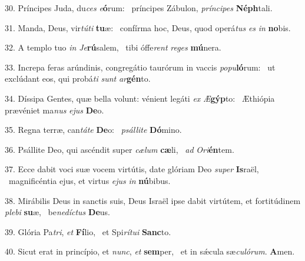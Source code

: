 30. Príncipes Juda, du\textit{ces} \textit{e}\textbf{ó}rum: \ast\  príncipes Zábulon, \textit{prín}\textit{ci}\textit{pes} \textbf{Néph}tali.\

31. Manda, Deus, vir\textit{tú}\textit{ti} \textbf{tu}æ: \ast\  confírma hoc, Deus, quod operá\textit{tus} \textit{es} \textit{in} \textbf{no}bis.\

32. A templo tuo \textit{in} \textit{Je}\textbf{rú}salem, \ast\  tibi óffe\textit{rent} \textit{re}\textit{ges} \textbf{mú}nera.\

33. Increpa feras arúndinis, congregátio taurórum in vaccis \textit{po}\textit{pu}\textbf{ló}rum: \ast\  ut exclúdant eos, qui probá\textit{ti} \textit{sunt} \textit{ar}\textbf{gén}to.\

34. Díssipa Gentes, quæ bella volunt: vénient legáti \textit{ex} \textit{Æ}\textbf{gýp}to: \ast\  Æthiópia prævéniet ma\textit{nus} \textit{e}\textit{jus} \textbf{De}o.\

35. Regna terræ, can\textit{tá}\textit{te} \textbf{De}o: \ast\  \textit{psál}\textit{li}\textit{te} \textbf{Dó}mino.\

36. Psállite Deo, qui ascéndit super \textit{cæ}\textit{lum} \textbf{cæ}li, \ast\  \textit{ad} \textit{O}\textit{ri}\textbf{én}tem.\

37. Ecce dabit voci suæ vocem virtútis, date glóriam Deo \textit{su}\textit{per} \textbf{Is}raël, \ast\  magnificéntia ejus, et virtus \textit{e}\textit{jus} \textit{in} \textbf{nú}bibus.\

38. Mirábilis Deus in sanctis suis, Deus Israël ipse dabit virtútem, et fortitúdinem \textit{ple}\textit{bi} \textbf{su}æ, \ast\  be\textit{ne}\textit{díc}\textit{tus} \textbf{De}us.\

39. Glória Pa\textit{tri}, \textit{et} \textbf{Fí}lio, \ast\  et Spi\textit{rí}\textit{tu}\textit{i} \textbf{Sanc}to.\

40. Sicut erat in princípio, et \textit{nunc}, \textit{et} \textbf{sem}per, \ast\  et in sǽcula sæ\textit{cu}\textit{ló}\textit{rum}. \textbf{A}men.\

